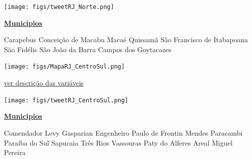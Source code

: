 \documentclass[10pt]{article} %
\begin{document}
\begin{minipage}[t]{.66\linewidth}
\begin{center}
\texttt{[image: figs/tweetRJ\_Norte.png]}\end{center}
\end{minipage}\hfill\begin{minipage}[t]{.30\linewidth}
\begin{mdframed}[style=sidebar,frametitle={}]
\textbf{\hyperlink{municips}{Municipios}}\begin{itemize}\gsquare Carapebus 
\gsquare Conceição de Macabu 
\gsquare Macaé 
\ysquare Quissamã 
\ysquare São Francisco de Itabapoana 
\ysquare São Fidélis 
\ysquare São João da Barra 
\ysquare Campos dos Goytacazes 
\end{itemize}\BackToContents\end{mdframed}\hfill\end{minipage}\newpage\begin{minipage}[t]{.66\linewidth}
\hypertarget{CntS}{}
\texttt{[image: figs/MapaRJ\_CentroSul.png]}\vspace{0.5cm}\begin{center}

\end{center}
\small{\hyperlink{vartab}{ver descrição das variáveis}}\vspace{0.5cm}\begin{center}
\texttt{[image: figs/tweetRJ\_CentroSul.png]}\end{center}
\end{minipage}\hfill\begin{minipage}[t]{.30\linewidth}
\begin{mdframed}[style=sidebar,frametitle={}]
\textbf{\hyperlink{municips}{Municipios}}\begin{itemize}\gsquare Comendador Levy Gasparian 
\gsquare Engenheiro Paulo de Frontin 
\gsquare Mendes 
\gsquare Paracambi 
\gsquare Paraíba do Sul 
\gsquare Sapucaia 
\gsquare Três Rios 
\gsquare Vassouras 
\gsquare Paty do Alferes 
\gsquare Areal 
\gsquare Miguel Pereira 
\end{itemize}\BackToContents\end{mdframed}\hfill\end{minipage}\newpage\begin{minipage}[t]{.66\linewidth}

\end{minipage}
\end{document}
